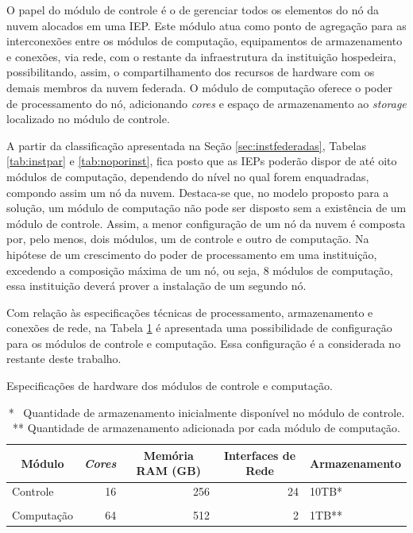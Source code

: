 \documentclass[tese,capa]{texufpel}
\begin{document}
O papel do módulo de controle é o de gerenciar todos os elementos do nó da nuvem alocados em uma IEP. Este módulo atua como ponto de agregação para as interconexões entre os módulos de computação, equipamentos de armazenamento e conexões, via rede, com o restante da infraestrutura da instituição hospedeira, possibilitando, assim, o compartilhamento dos recursos de hardware com os demais membros da nuvem federada. O módulo de computação oferece o poder de processamento do nó, adicionando \emph{cores} e espaço de armazenamento ao \emph{storage} localizado no módulo de controle.

A partir da classificação apresentada na Seção \ref{sec:instfederadas}, Tabelas \ref{tab:instpar} e \ref{tab:noporinst}, fica posto que as IEPs poderão dispor de até oito módulos de computação, dependendo do nível no qual forem enquadradas, compondo assim um nó da nuvem. Destaca-se que, no modelo proposto para a solução, um módulo de computação não pode ser disposto sem a existência de um módulo de controle. Assim, a menor configuração de um nó da nuvem é composta por, pelo menos, dois módulos, um de controle e outro de computação. Na hipótese de um crescimento do poder de processamento em uma instituição, excedendo a composição máxima de um nó, ou seja, 8 módulos de computação, essa instituição deverá prover a instalação de um segundo nó.

Com relação às especificações técnicas de processamento, armazenamento e conexões de rede, na Tabela \ref{tab:modulosespec} é apresentada uma possibilidade de configuração para os módulos de controle e computação. Essa configuração é a considerada no restante deste trabalho.

\begin{table}[H]
    \centering
    \caption{Especificações de hardware dos módulos de controle e computação.}
    \label{tab:modulosespec}
    \begin{tabular}{@{}lrrrl@{}}
        \toprule
        \multicolumn{1}{c}{\textbf{Módulo}} &
        \multicolumn{1}{c}{\textit{\textbf{Cores}}} &
        \multicolumn{1}{c}{\textbf{Memória RAM (GB)}} &
        \multicolumn{1}{c}{\textbf{Interfaces de Rede}} &
        \multicolumn{1}{c}{\textbf{Armazenamento}} \\ \midrule
        Controle   & 16 & 256 & 24 & 10TB* \\
                   &    &     &    &               \\
        Computação & 64 & 512 & 2  & 1TB** \\ \bottomrule
    \end{tabular}
    \caption*{*~ Quantidade de armazenamento inicialmente disponível no módulo de controle.\\ ** Quantidade de armazenamento adicionada por cada módulo de computação.}
\end{table}
  
\end{document}
